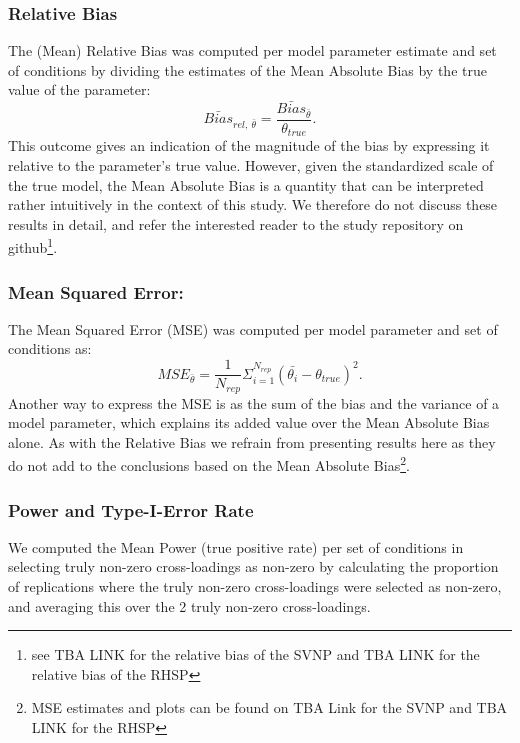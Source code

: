 \documentclass[
  man, donotrepeattitle,floatsintext]{apa6}
\begin{document}
\hypertarget{relative-bias}{%
\subsubsection{Relative Bias}\label{relative-bias}}

The (Mean) Relative Bias was computed per model parameter estimate and set of conditions by dividing the estimates of the Mean Absolute Bias by the true value of the parameter:
\[\bar{Bias}_{rel, \ \bar{\theta} } = \frac{\bar{Bias}_{\bar{\theta}}}{\theta_{true} }.\]
This outcome gives an indication of the magnitude of the bias by expressing it relative to the parameter's true value. However, given the standardized scale of the true model, the Mean Absolute Bias is a quantity that can be interpreted rather intuitively in the context of this study. We therefore do not discuss these results in detail, and refer the interested reader to the study repository on github\footnote{see TBA LINK for the relative bias of the SVNP and TBA LINK for the relative bias of the RHSP}.

\hypertarget{mean-squared-error}{%
\subsubsection{Mean Squared Error:}\label{mean-squared-error}}

The Mean Squared Error (MSE) was computed per model parameter and set of conditions as:
\[MSE_{\bar{\theta}} = \frac{1}{N_{rep}} \Sigma_{i = 1}^{N_{rep}} (\bar{\theta_i} - \theta_{true})^2.\]
Another way to express the MSE is as the sum of the bias and the variance of a model parameter, which explains its added value over the Mean Absolute Bias alone. As with the Relative Bias we refrain from presenting results here as they do not add to the conclusions based on the Mean Absolute Bias\footnote{MSE estimates and plots can be found on TBA Link for the SVNP and TBA LINK for the RHSP}.

\hypertarget{power-and-type-i-error-rate}{%
\subsubsection{Power and Type-I-Error Rate}\label{power-and-type-i-error-rate}}

We computed the Mean Power (true positive rate) per set of conditions in selecting truly non-zero cross-loadings as non-zero by calculating the proportion of replications where the truly non-zero cross-loadings were selected as non-zero, and averaging this over the 2 truly non-zero cross-loadings.
\end{document}

